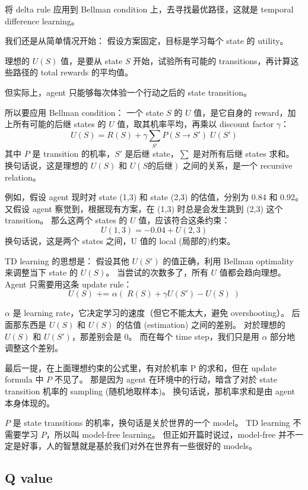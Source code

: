 \documentclass[orivec]{llncs}
\begin{document}
将 delta rule 应用到 Bellman condition 上，去寻找最优路径，这就是 temporal difference learning。

我们还是从简单情况开始：  假设方案固定，目标是学习每个 state 的 utility。

理想的 $U(S)$ 值，是要从 state $S$ 开始，试验所有可能的 transitions，再计算这些路径的 total rewards 的平均值。

但实际上，agent 只能够每次体验一个行动之后的 state transition。

所以要应用 Bellman condition： 一个 state $S$ 的 $U$ 值，是它自身的 reward，加上所有可能的后继 states 的 $U$ 值，取其机率平均，再乘以 discount factor $\gamma$：
$$ U(S) = R(S) + \gamma \sum_{S'} P(S \rightarrow S') \; U(S') $$
其中 $P$ 是 transition 的机率，$S'$ 是后继 state，$\sum$ 是对所有后继 states 求和。  换句话说，这是理想的 $U(S)$ 和 $U(S \mbox{的后继})$ 之间的关系，是一个 recursive relation。

例如，假设 agent 现时对 state (1,3) 和 state (2,3) 的估值，分别为 0.84 和 0.92。  又假设 agent 察觉到，根据现有方案，在 (1,3) 时总是会发生跳到 (2,3) 这个 transition。  那么这两个 states 的 $U$ 值，应该符合这条约束：
$$ U(1,3) = -0.04 + U(2,3) $$
换句话说，这是两个 states 之间，U 值的 local (局部的)约束。

TD learning 的思想是：  假设其他 $U(S')$ 的值正确，利用 Bellman optimality 来调整当下 state 的 $U(S)$。 当尝试的次数多了，所有 $U$ 值都会趋向理想。 Agent 只需要用这条 update rule：
$$ U(S) \mbox{  +=  } \alpha ( \; R(S) + \gamma U(S') - U(S) \; ) $$

$\alpha$ 是 learning rate，它决定学习的速度（但它不能太大，避免 overshooting）。  后面那东西是 $U(S)$ 和 $U(S)$ 的估值 (estimation) 之间的差别。  对於理想的 $U(S)$ 和 $U(S')$，那差别会是 0。  而在每个 time step，我们只是用 $\alpha$ 部分地 调整这个差别。

最后一提，在上面理想约束的公式里，有对於机率 P 的求和，但在 update formula 中 $P$ 不见了。  那是因为 agent 在环境中的行动，暗含了对於 state transition 机率的 sampling (随机地取样本)。 换句话说，那机率求和是由 agent 本身体现的。

$P$ 是 state transitions 的机率，换句话是关於世界的一个 model。 TD learning 不需要学习 $P$，所以叫 model-free learning。  但正如开篇时说过，model-free 并不一定是好事，人的智慧就是基於我们对外在世界有一些很好的 models。

\subsection{Q value}
\end{document}

